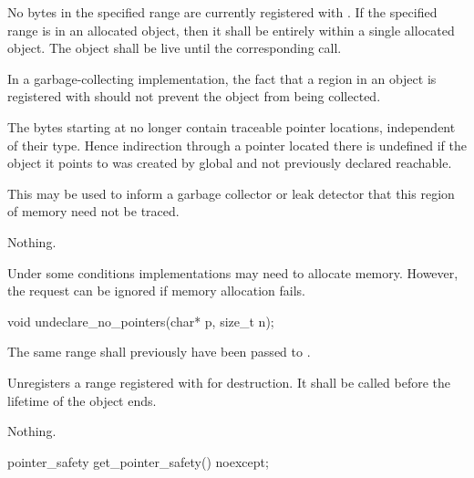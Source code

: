 \begin{itemdescr}
\pnum
\requires No bytes in the specified range
are currently registered with
. If the specified range is in an allocated object,
then it shall be entirely within a single allocated object. The object shall be
live until the corresponding  call. \begin{note} In
a garbage-collecting implementation, the fact that a region in an object is
registered with  should not prevent the object from
being collected. \end{note}

\pnum
\effects The  bytes starting at  no longer contain
traceable pointer locations, independent of their type. Hence
indirection through a pointer located there is undefined if the object
it points to was created by global  and not
previously declared reachable. \begin{note} This may be used to inform a
garbage collector or leak detector that this region of memory need not
be traced. \end{note}

\pnum
\throws Nothing.

\pnum
\begin{note} Under some conditions implementations may need to allocate memory.
However, the request can be ignored if memory allocation fails. \end{note}
\end{itemdescr}

%
\begin{itemdecl}
void undeclare_no_pointers(char* p, size_t n);
\end{itemdecl}

\begin{itemdescr}
\pnum
\requires The same range shall previously have been passed to
.

\pnum
\effects Unregisters a range registered with  for
destruction. It shall be called before the lifetime of the object ends.

\pnum
\throws Nothing.
\end{itemdescr}

%
\begin{itemdecl}
pointer_safety get_pointer_safety() noexcept;
\end{itemdecl}

